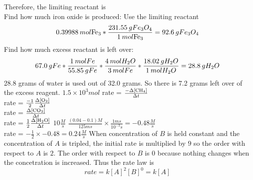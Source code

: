 \documentclass[../main.tex]{subfiles}
\begin{document}
Therefore, the limiting reactant is  \\
Find how much iron oxide is produced: Use the limiting reactant
\begin{equation}
    0.39988\hspace{0.2em}mol \ce{Fe_{3}} * \frac{231.55\hspace{0.2em}gFe_{3}O_{4}}{1\hspace{0.2em} mol\ce{Fe_{3}}} = 92.6 \hspace{0.2em}g Fe_{3}O_{4}
\end{equation}
Find how much excess reactant is left over:
\begin{equation}
    67.0\hspace{0.2em}gFe * \frac{1\hspace{0.2em}molFe}{55.85\hspace{0.2em}gFe} * \frac{4\hspace{0.2em}mol H_{2}O}{3\hspace{0.2em}molFe} * \frac{18.02\hspace{0.2em}gH_{2}O}{1\hspace{0.2em}molH_{2}O} = 28.8\hspace{0.2em}g H_{2}O
\end{equation}
28.8 grams of water is used out of 32.0 grams. So there is 7.2 grams left over of the excess reagent. 
\AnswerSet
\(1.5 \times 10^3mol\) 
\AnswerSet 
{} \hspace{0.5em} rate = \(\frac{-\Delta [\ce{CH4}]}{\Delta t}\) \\
 \hspace{0.5em} rate = \(\frac{-1}{2} \frac{\Delta [\ce{O2}]}{\Delta t}\) \\
 \hspace{0.5em} rate = \(\frac{\Delta [\ce{CO2}]}{\Delta t}\) \\
 \hspace{0.5em} rate = \(\frac{1}{2} \frac{\Delta [\ce{H2O}]}{\Delta t}\)
\AnswerSet
\(10\frac{M}{s}\)
\AnswerSet
\(\frac{(0.04 - 0.1)M}{125ms} \times \frac{1ms}{10^{-3}s} = -0.48 \frac{M}{s}\)\\
rate = \(-\frac{1}{2} \times -0.48 = 0.24 \frac{M}{s}\)
\AnswerSet
When concentration of \(B\) is held constant and the concentration of \(A\) is tripled, the initial rate is multiplied by \(9\) so the order with respect to \(A\)
is \(2\). The order with respect to \(B\) is \(0\) because nothing changes when the concetration is increased. Thus the rate law is 
\begin{equation*}
    rate = k[A]^2[B]^0 = k[A]
\end{equation*}
\end{document}
